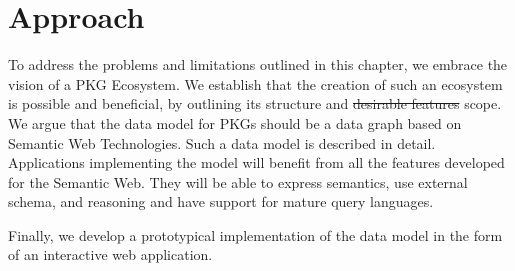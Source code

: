 \section{Approach}
To address the problems and limitations outlined in this chapter, we embrace the vision of a PKG Ecosystem. We establish that the creation of such an ecosystem is possible and beneficial, by outlining its structure and \sout{desirable features} scope. We argue that the data model for PKGs should be a data graph based on Semantic Web Technologies. Such a data model is described in detail. Applications implementing the model will benefit from all the features developed for the Semantic Web. They will be able to express semantics, use external schema, and reasoning and have support for mature query languages. 

Finally, we develop a prototypical implementation of the data model in the form of an interactive web application.



